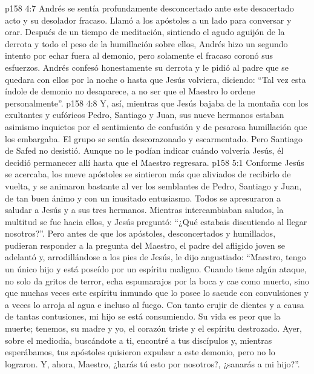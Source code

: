 \vs p158 4:7 Andrés se sentía profundamente desconcertado ante este desacertado acto y su desolador fracaso. Llamó a los apóstoles a un lado para conversar y orar. Después de un tiempo de meditación, sintiendo el agudo aguijón de la derrota y todo el peso de la humillación sobre ellos, Andrés hizo un segundo intento por echar fuera al demonio, pero solamente el fracaso coronó sus esfuerzos. Andrés confesó honestamente su derrota y le pidió al padre que se quedara con ellos por la noche o hasta que Jesús volviera, diciendo: “Tal vez esta índole de demonio no desaparece, a no ser que el Maestro lo ordene personalmente”.
\vs p158 4:8 Y, así, mientras que Jesús bajaba de la montaña con los exultantes y eufóricos Pedro, Santiago y Juan, sus nueve hermanos estaban asimismo inquietos por el sentimiento de confusión y de pesarosa humillación que los embargaba. El grupo se sentía descorazonado y escarmentado. Pero Santiago de Safed no desistió. Aunque no le podían indicar cuándo volvería Jesús, él decidió permanecer allí hasta que el Maestro regresara.
\vs p158 5:1 Conforme Jesús se acercaba, los nueve apóstoles se sintieron más que aliviados de recibirlo de vuelta, y se animaron bastante al ver los semblantes de Pedro, Santiago y Juan, de tan buen ánimo y con un inusitado entusiasmo. Todos se apresuraron a saludar a Jesús y a sus tres hermanos. Mientras intercambiaban saludos, la multitud se fue hacia ellos, y Jesús preguntó: “¿Qué estabais discutiendo al llegar nosotros?”. Pero antes de que los apóstoles, desconcertados y humillados, pudieran responder a la pregunta del Maestro, el padre del afligido joven se adelantó y, arrodillándose a los pies de Jesús, le dijo angustiado: “Maestro, tengo un único hijo y está poseído por un espíritu maligno. Cuando tiene algún ataque, no solo da gritos de terror, echa espumarajos por la boca y cae como muerto, sino que muchas veces este espíritu inmundo que lo posee lo sacude con convulsiones y a veces lo arroja al agua e incluso al fuego. Con tanto crujir de dientes y a causa de tantas contusiones, mi hijo se está consumiendo. Su vida es peor que la muerte; tenemos, su madre y yo, el corazón triste y el espíritu destrozado. Ayer, sobre el mediodía, buscándote a ti, encontré a tus discípulos y, mientras esperábamos, tus apóstoles quisieron expulsar a este demonio, pero no lo lograron. Y, ahora, Maestro, ¿harás tú esto por nosotros?, ¿sanarás a mi hijo?”.
